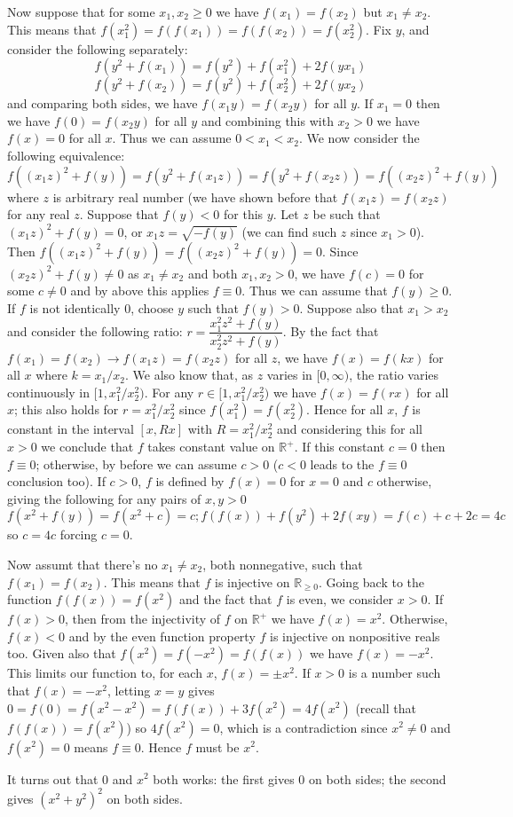 \documentclass[11pt,a4paper]{article}
\begin{document}
\begin{enumerate}
	Now suppose that for some $x_1, x_2\ge 0$ we have $f(x_1)=f(x_2)$ but $x_1\neq x_2$. 
	This means that $f(x_1^2)=f(f(x_1))=f(f(x_2))=f(x_2^2)$. Fix $y$, and consider the following separately:
	\[
	f(y^2+f(x_1)) = f(y^2)+f(x_1^2)+2f(yx_1)
	\]
	\[
	f(y^2+f(x_2)) = f(y^2)+f(x_2^2)+2f(yx_2)
	\]
	and comparing both sides, we have $f(x_1y)=f(x_2y)$ for all $y$. If $x_1=0$ then we have $f(0)=f(x_2y)$ for all $y$ and combining this with $x_2>0$ we have $f(x)=0$ for all $x$. 
	Thus we can assume $0<x_1<x_2$. We now consider the following equivalence:
	\[f((x_1z)^2+f(y))=f(y^2+f(x_1z))=f(y^2+f(x_2z))=f((x_2z)^2+f(y))
	\]
	where $z$ is arbitrary real number (we have shown before that $f(x_1z)=f(x_2z)$ for any real $z$. 
	Suppose that $f(y)<0$ for this $y$. Let $z$ be such that $(x_1z)^2+f(y)=0$, or $x_1z=\sqrt{-f(y)}$ (we can find such $z$ since $x_1>0$). Then $f((x_1z)^2+f(y))=f((x_2z)^2+f(y))=0$. Since $(x_2z)^2+f(y)\neq 0$ as $x_1\neq x_2$ and both $x_1, x_2>0$, we have $f(c)=0$ for some $c\neq 0$ and by above this applies $f\equiv 0$. 
	Thus we can assume that $f(y)\ge 0$. If $f$ is not identically 0, choose $y$ such that $f(y)>0$. Suppose also that $x_1>x_2$ and consider the following ratio: $r=\dfrac{x_1^2z^2+f(y)}{x_2^2z^2+f(y)}$. By the fact that $f(x_1)=f(x_2)\to f(x_1z)=f(x_2z)$ for all $z$, we have $f(x)=f(kx)$ for all $x$ where $k=x_1/x_2$. We also know that, as $z$ varies in $[0, \infty)$, the ratio varies continuously in $[1,x_1^2/x_2^2)$. For any $r\in [1,x_1^2/x_2^2)$ we have $f(x)=f(rx)$ for all $x$; this also holds for $r=x_1^2/x_2^2$ since $f(x_1^2)=f(x_2^2)$. Hence for all $x$, $f$ is constant in the interval $[x, Rx]$ with $R=x_1^2/x_2^2$ and considering this for all $x>0$ we conclude that $f$ takes constant value on $\mathbb{R}^+$. 
	If this constant $c=0$ then $f\equiv 0$; otherwise, by before we can assume $c>0$ ($c<0$ leads to the $f\equiv 0$ conclusion too). If $c>0$, $f$ is defined by $f(x)=0$ for $x=0$ and $c$ otherwise, giving the following for any pairs of $x, y>0$
	\[f(x^2+f(y))=f(x^2+c)=c; f(f(x))+f(y^2)+2f(xy)=f(c)+c+2c=4c
	\]
	so $c=4c$ forcing $c=0$. 
	
	Now assumt that there's no $x_1\neq x_2$, both nonnegative, such that $f(x_1)=f(x_2)$. This means that $f$ is injective on $\mathbb{R}_{\ge 0}$. Going back to the function $f(f(x))=f(x^2)$ and the fact that $f$ is even, we consider $x>0$. If $f(x)>0$, then from the injectivity of $f$ on $\mathbb{R}^+$ we have $f(x)=x^2$. Otherwise, $f(x)<0$ and by the even function property $f$ is injective on nonpositive reals too. Given also that $f(x^2)=f(-x^2)=f(f(x))$ we have $f(x)=-x^2$. This limits our function to, for each $x$, $f(x)=\pm x^2$. 
	If $x>0$ is a number such that $f(x)=-x^2$, letting $x=y$ gives $0= f(0)=f(x^2-x^2)=f(f(x))+3f(x^2)=4f(x^2)$ (recall that $f(f(x))=f(x^2)$) so $4f(x^2)=0$, which is a contradiction since $x^2\neq 0$ and $f(x^2)=0$ means $f\equiv 0$. Hence $f$ must be $x^2$. 
	
	It turns out that $0$ and $x^2$ both works: the first gives 0 on both sides; the second gives $(x^2+y^2)^2$ on both sides. 
	
\end{enumerate}
\end{document}
